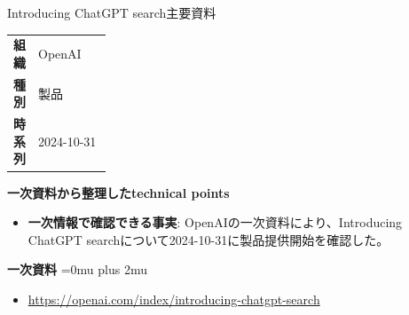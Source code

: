 \begin{technicalnote}{Introducing ChatGPT search}{主要資料}
\begingroup
\begin{tabularx}{\linewidth}{@{}>{\bfseries}p{0.22\linewidth}X@{}}
組織 & OpenAI \\
種別 & 製品 \\
時系列 & 2024-10-31 \\
\end{tabularx}
\smallskip
{\bfseries 一次資料から整理したtechnical points}
\begin{itemize}[leftmargin=1.5em,itemsep=0.35em]
\item \textbf{一次情報で確認できる事実}: OpenAIの一次資料により、Introducing ChatGPT searchについて2024-10-31に製品提供開始を確認した。
\end{itemize}
\begin{minipage}{\linewidth}
\begin{samepage}
{\bfseries 一次資料}
\begingroup\sloppy
\Urlmuskip=0mu plus 2mu\relax
\begin{itemize}[leftmargin=1.5em,itemsep=0.25em]
\item {\scriptsize\url{https://openai.com/index/introducing-chatgpt-search}}
\end{itemize}
\endgroup
\end{samepage}
\end{minipage}
\endgroup
\end{technicalnote}
\medskip

